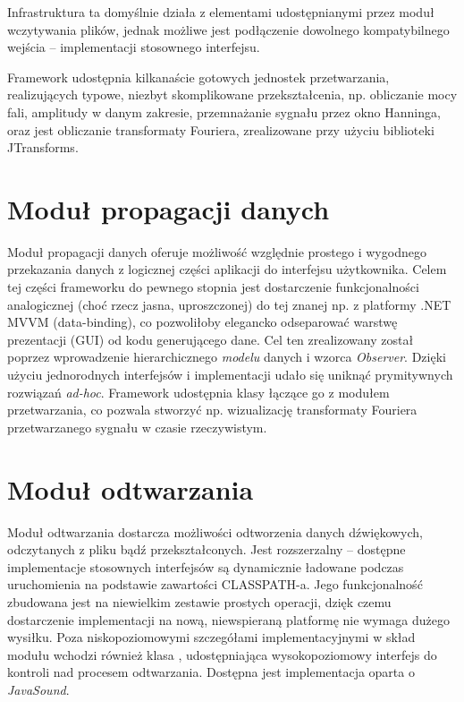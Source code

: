 Infrastruktura ta domyślnie działa z elementami udostępnianymi przez moduł wczytywania plików,
jednak możliwe jest podłączenie dowolnego kompatybilnego wejścia -- implementacji stosownego
interfejsu.

Framework udostępnia kilkanaście gotowych jednostek przetwarzania, realizujących typowe, niezbyt
skomplikowane przekształcenia, np. obliczanie mocy fali, amplitudy w danym zakresie, przemnażanie
sygnału przez okno Hanninga, oraz jest obliczanie transformaty Fouriera, zrealizowane przy użyciu
biblioteki JTransforms.


\section{Moduł propagacji danych}

Moduł propagacji danych oferuje możliwość względnie prostego i wygodnego przekazania danych z
logicznej części aplikacji do interfejsu użytkownika. Celem tej części frameworku do pewnego stopnia
jest dostarczenie funkcjonalności analogicznej (choć rzecz jasna, uproszczonej) do tej znanej np. z
platformy .NET MVVM (data-binding), co pozwoliłoby elegancko odseparować warstwę prezentacji (GUI)
od kodu generującego dane. Cel ten zrealizowany został poprzez wprowadzenie hierarchicznego
\emph{modelu} danych i wzorca \emph{Observer}. Dzięki użyciu jednorodnych interfejsów i
implementacji udało się uniknąć prymitywnych rozwiązań \textit{ad-hoc}.  Framework udostępnia klasy
łączące go z modułem przetwarzania, co pozwala stworzyć np. wizualizację transformaty Fouriera
przetwarzanego sygnału w czasie rzeczywistym.


\section{Moduł odtwarzania}

Moduł odtwarzania dostarcza możliwości odtworzenia danych dźwiękowych, odczytanych z pliku bądź
przekształconych. Jest rozszerzalny -- dostępne implementacje stosownych interfejsów są dynamicznie
ładowane podczas uruchomienia na podstawie zawartości CLASSPATH-a. Jego funkcjonalność zbudowana
jest na niewielkim zestawie prostych operacji, dzięk czemu dostarczenie implementacji na nową,
niewspieraną platformę nie wymaga dużego wysiłku. Poza niskopoziomowymi szczegółami
implementacyjnymi w skład modułu wchodzi również klasa , udostępniająca wysokopoziomowy
interfejs do kontroli nad procesem odtwarzania. Dostępna jest implementacja oparta o
\textit{JavaSound}.


